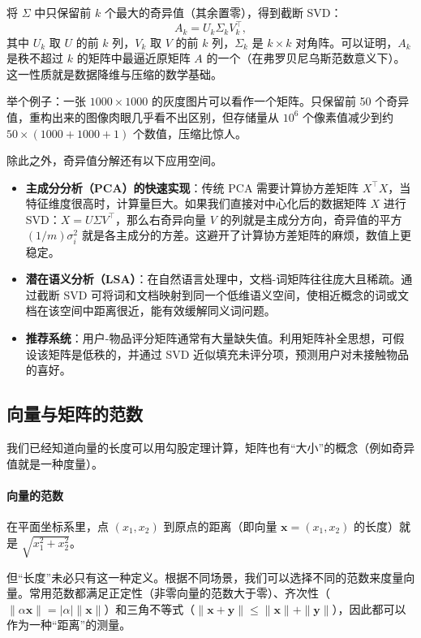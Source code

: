 将 \(\Sigma\) 中只保留前 \(k\) 个最大的奇异值（其余置零），得到截断 SVD：
\[
    A_k = U_k \Sigma_k V_k^\top,
\]
其中 \(U_k\) 取 \(U\) 的前 \(k\) 列，\(V_k\) 取 \(V\) 的前 \(k\) 列，\(\Sigma_k\) 是 \(k\times k\) 对角阵。可以证明，\(A_k\) 是秩不超过 \(k\) 的矩阵中最逼近原矩阵 \(A\) 的一个（在弗罗贝尼乌斯范数意义下）。这一性质就是数据降维与压缩的数学基础。

举个例子：一张 \(1000 \times 1000\) 的灰度图片可以看作一个矩阵。只保留前 50 个奇异值，重构出来的图像肉眼几乎看不出区别，但存储量从 \(10^6\) 个像素值减少到约 \(50 \times (1000+1000+1)\) 个数值，压缩比惊人。

除此之外，奇异值分解还有以下应用空间。
\begin{itemize}
    \item \textbf{主成分分析（PCA）的快速实现}：传统 PCA 需要计算协方差矩阵 \(X^\top X\)，当特征维度很高时，计算量巨大。如果我们直接对中心化后的数据矩阵 \(X\) 进行 SVD：\(X = U \Sigma V^\top\)，那么右奇异向量 \(V\) 的列就是主成分方向，奇异值的平方 \((1/m)\sigma_i^2\) 就是各主成分的方差。这避开了计算协方差矩阵的麻烦，数值上更稳定。
    \item \textbf{潜在语义分析（LSA）}：在自然语言处理中，文档-词矩阵往往庞大且稀疏。通过截断 SVD 可将词和文档映射到同一个低维语义空间，使相近概念的词或文档在该空间中距离很近，能有效缓解同义词问题。
    \item \textbf{推荐系统}：用户-物品评分矩阵通常有大量缺失值。利用矩阵补全思想，可假设该矩阵是低秩的，并通过 SVD 近似填充未评分项，预测用户对未接触物品的喜好。
\end{itemize}

\subsection{向量与矩阵的范数}

我们已经知道向量的长度可以用勾股定理计算，矩阵也有“大小”的概念（例如奇异值就是一种度量）。

\paragraph{向量的范数}

在平面坐标系里，点 \((x_1, x_2)\) 到原点的距离（即向量 \(\mathbf{x} = (x_1, x_2)\) 的长度）就是 \(\sqrt{x_1^2 + x_2^2}\)。

但“长度”未必只有这一种定义。根据不同场景，我们可以选择不同的范数来度量向量。常用范数都满足正定性（非零向量的范数大于零）、齐次性（\(\|\alpha \mathbf{x}\| = |\alpha| \|\mathbf{x}\|\)）和三角不等式（\(\|\mathbf{x} + \mathbf{y}\| \le \|\mathbf{x}\| + \|\mathbf{y}\|\)），因此都可以作为一种“距离”的测量。

